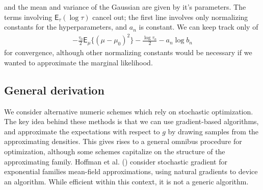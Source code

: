 \documentclass[
  11pt,
  letterpaper,
]{scrbook}
\theoremstyle{definition}
\theoremstyle{definition}
\theoremstyle{definition}
\theoremstyle{plain}
\theoremstyle{plain}
\theoremstyle{plain}
\theoremstyle{remark}
\begin{document}
and the mean and variance of the Gaussian are given by it's parameters.
The terms involving \(\mathsf{E}_{\tau}(\log \tau)\) cancel out; the
first line involves only normalizing constants for the hyperparameters,
and \(a_n\) is constant. We can keep track only of \begin{align*}
- \frac{\tau_0}{2} \mathsf{E}_{\mu}\{(\mu - \mu_0)^2\} - \frac{\log\tau_n}{2}-a_n\log b_n
\end{align*} for convergence, although other normalizing constants would
be necessary if we wanted to approximate the marginal likelihood.

\subsection{General derivation}\label{general-derivation}

We consider alternative numeric schemes which rely on stochastic
optimization. The key idea behind these methods is that we can use
gradient-based algorithms, and approximate the expectations with respect
to \(g\) by drawing samples from the approximating densities. This gives
rises to a general omnibus procedure for optimization, although some
schemes capitalize on the structure of the approximating family. Hoffman
et al. () consider stochastic gradient
for exponential families mean-field approximations, using natural
gradients to device an algorithm. While efficient within this context,
it is not a generic algorithm.
\end{document}
